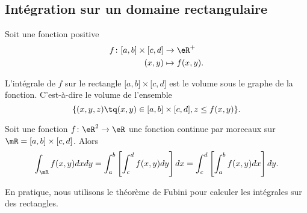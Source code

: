 \subsection{Intégration sur un domaine rectangulaire}
\label{PgRapIntMultFubiniRect}

Soit une fonction positive
\begin{equation}
	\begin{aligned}
		f\colon \mathopen[ a , b \mathclose]\times\mathopen[ c , d \mathclose] & \to \eR^+       \\
		(x,y)                                                                  & \mapsto f(x,y).
	\end{aligned}
\end{equation}

L'intégrale de $f$ sur le rectangle $\mathopen[ a , b \mathclose]\times\mathopen[ c , d \mathclose]$ est le volume sous le graphe de la fonction. C'est-à-dire le volume de l'ensemble
\begin{equation}
	\{ (x,y,z)\tq (x,y)\in\mathopen[ a , b \mathclose]\times\mathopen[ c , d \mathclose], z\leq f(x,y) \}.
\end{equation}

\begin{theorem}
	Soit une fonction $f\colon \eR^2\to \eR$ une fonction continue par morceaux sur $\mR=\mathopen[ a , b \mathclose]\times\mathopen[ c , d \mathclose]$. Alors
	\begin{equation}
		\int_{\mR}f(x,y)dxdy=\int_a^b\left[ \int_c^df(x,y)dy \right]dx=\int_c^d\left[ \int_a^bf(x,y)dx \right]dy.
	\end{equation}
\end{theorem}

En pratique, nous utilisons le théorème de Fubini pour calculer les intégrales sur des rectangles.

